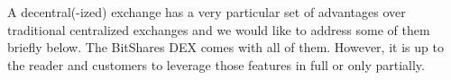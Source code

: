 A decentral(-ized) exchange has a very particular set of advantages over
traditional centralized exchanges and we would like to address some of them
briefly below. The BitShares DEX comes with all of them. However, it is up to
the reader and customers to leverage those features in full or only partially.
